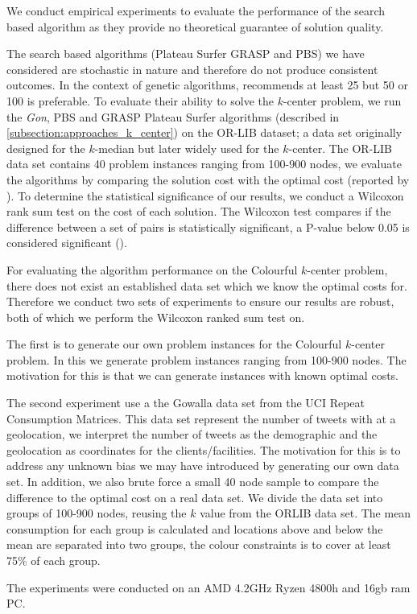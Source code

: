 We conduct empirical experiments to evaluate the performance of the search based algorithm as they provide no theoretical guarantee of solution quality.

The search based algorithms (Plateau Surfer GRASP and PBS) we have considered are stochastic in nature and therefore do not produce consistent outcomes. In the context of genetic algorithms, \textcite{kramer_genetic_2017} recommends at least 25 but 50 or 100 is preferable. To evaluate their ability to solve the $k$-center problem, we run the \emph{Gon}, PBS and GRASP Plateau Surfer algorithms (described in \cref{subsection:approaches_k_center}) on the OR-LIB dataset; a data set originally designed for the $k$-median but later widely used for the $k$-center. The OR-LIB data set contains 40 problem instances ranging from 100-900 nodes, we evaluate the algorithms by comparing the solution cost with the optimal cost (reported by \cite{pullan_memetic_2008}). To determine the statistical significance of our results, we conduct a Wilcoxon rank sum test on the cost of each solution. The Wilcoxon test compares if the difference between a set of pairs is statistically significant, a P-value below 0.05 is considered significant (\cite{wilcoxon_individual_1992}).

For evaluating the algorithm performance on the Colourful $k$-center problem, there does not exist an established data set which we know the optimal costs for. Therefore we conduct two sets of experiments to ensure our results are robust, both of which we perform the Wilcoxon ranked sum test on.

The first is to generate our own problem instances for the Colourful $k$-center problem. In this we generate problem instances ranging from 100-900 nodes. The motivation for this is that we can generate instances with known optimal costs.

The second experiment use a the Gowalla data set from the UCI Repeat Consumption Matrices. This data set represent the number of tweets with at a geolocation, we interpret the number of tweets as the demographic and the geolocation as coordinates for the clients/facilities. The motivation for this is to address any unknown bias we may have introduced by generating our own data set. In addition, we also brute force a small 40 node sample to compare the difference to the optimal cost on a real data set. We divide the data set into groups of 100-900 nodes, reusing the $k$ value from the ORLIB data set. The mean consumption for each group is calculated and locations above and below the mean are separated into two groups, the colour constraints is to cover at least 75\% of each group.

The experiments were conducted on an AMD 4.2GHz Ryzen 4800h and 16gb ram PC. 